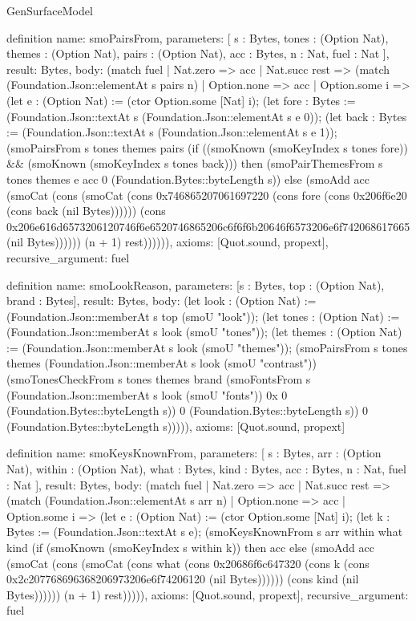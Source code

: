 \begin{lexlean}{GenSurfaceModel}
\begin{semanticmodule}
definition{
  name: smoPairsFrom,
  parameters: [
    s : Bytes,
    tones : (Option Nat),
    themes : (Option Nat),
    pairs : (Option Nat),
    acc : Bytes,
    n : Nat,
    fuel : Nat
  ],
  result: Bytes,
  body: (match fuel
    | Nat.zero => acc
    | Nat.succ rest => (match (Foundation.Json::elementAt s pairs n)
      | Option.none => acc
      | Option.some i => (let e : (Option Nat) := (ctor Option.some [Nat] i); (let fore : Bytes := (Foundation.Json::textAt s (Foundation.Json::elementAt s e 0)); (let back : Bytes := (Foundation.Json::textAt s (Foundation.Json::elementAt s e 1)); (smoPairsFrom s tones themes pairs (if ((smoKnown (smoKeyIndex s tones fore)) && (smoKnown (smoKeyIndex s tones back))) then (smoPairThemesFrom s tones themes e acc 0 (Foundation.Bytes::byteLength s)) else (smoAdd acc (smoCat (cons (smoCat (cons 0x746865207061697220 (cons fore (cons 0x206f6e20 (cons back (nil Bytes)))))) (cons 0x206e616d6573206120746f6e6520746865206c6f6f6b20646f6573206e6f742068617665 (nil Bytes)))))) (n + 1) rest)))))),
  axioms: [Quot.sound, propext],
  recursive_argument: fuel
}

definition{
  name: smoLookReason,
  parameters: [s : Bytes, top : (Option Nat), brand : Bytes],
  result: Bytes,
  body: (let look : (Option Nat) := (Foundation.Json::memberAt s top (smoU "look")); (let tones : (Option Nat) := (Foundation.Json::memberAt s look (smoU "tones")); (let themes : (Option Nat) := (Foundation.Json::memberAt s look (smoU "themes")); (smoPairsFrom s tones themes (Foundation.Json::memberAt s look (smoU "contrast")) (smoTonesCheckFrom s tones themes brand (smoFontsFrom s (Foundation.Json::memberAt s look (smoU "fonts")) 0x 0 (Foundation.Bytes::byteLength s)) 0 (Foundation.Bytes::byteLength s)) 0 (Foundation.Bytes::byteLength s))))),
  axioms: [Quot.sound, propext]
}

definition{
  name: smoKeysKnownFrom,
  parameters: [
    s : Bytes,
    arr : (Option Nat),
    within : (Option Nat),
    what : Bytes,
    kind : Bytes,
    acc : Bytes,
    n : Nat,
    fuel : Nat
  ],
  result: Bytes,
  body: (match fuel
    | Nat.zero => acc
    | Nat.succ rest => (match (Foundation.Json::elementAt s arr n)
      | Option.none => acc
      | Option.some i => (let e : (Option Nat) := (ctor Option.some [Nat] i); (let k : Bytes := (Foundation.Json::textAt s e); (smoKeysKnownFrom s arr within what kind (if (smoKnown (smoKeyIndex s within k)) then acc else (smoAdd acc (smoCat (cons (smoCat (cons what (cons 0x20686f6c647320 (cons k (cons 0x2c207768696368206973206e6f74206120 (nil Bytes)))))) (cons kind (nil Bytes)))))) (n + 1) rest))))),
  axioms: [Quot.sound, propext],
  recursive_argument: fuel
}


\end{semanticmodule}
\end{lexlean}
